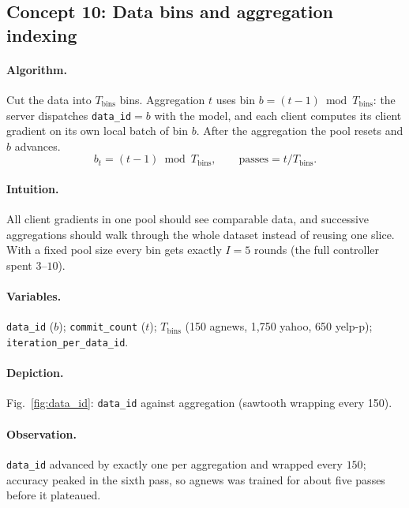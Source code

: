 \subsection{Concept 10: Data bins and aggregation indexing}
\paragraph{Algorithm.}
Cut the data into $T_{\mathrm{bins}}$ bins. Aggregation $t$ uses bin $b=(t-1)\bmod T_{\mathrm{bins}}$: the server dispatches \texttt{data\_id}$=b$ with the model, and each client computes its client gradient on its own local batch of bin $b$. After the aggregation the pool resets and $b$ advances.
\begin{equation}
b_t=(t-1)\bmod T_{\mathrm{bins}},\qquad\text{passes}=t/T_{\mathrm{bins}}.
\end{equation}
\paragraph{Intuition.}
All client gradients in one pool should see comparable data, and successive aggregations should walk through the whole dataset instead of reusing one slice.
With a fixed pool size every bin gets exactly $I=5$ rounds (the full controller spent $3$--$10$).
\paragraph{Variables.}
\texttt{data\_id} ($b$); \texttt{commit\_count} ($t$); $T_{\mathrm{bins}}$ (150 agnews, 1{,}750 yahoo, 650 yelp-p); \texttt{iteration\_per\_data\_id}.
\paragraph{Depiction.} Fig.~\ref{fig:data_id}: \texttt{data\_id} against aggregation (sawtooth wrapping every 150).
\paragraph{Observation.}
\texttt{data\_id} advanced by exactly one per aggregation and wrapped every $150$; accuracy peaked in the sixth pass, so agnews was trained for about five passes before it plateaued.

